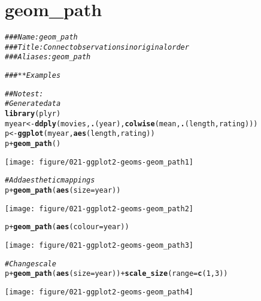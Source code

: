 \documentclass[a4paper,titlepage]{tufte-handout}\usepackage[]{graphicx}\usepackage[]{color}
\makeatletter
\def\maxwidth{ %
  \ifdim\Gin@nat@width>\linewidth
    \linewidth
  \else
    \Gin@nat@width
  \fi
}
\newcommand{\hlnum}[1]{\textcolor[rgb]{0.686,0.059,0.569}{#1}}%
\newcommand{\hlcom}[1]{\textcolor[rgb]{0.678,0.584,0.686}{\textit{#1}}}%
\newcommand{\hlopt}[1]{\textcolor[rgb]{0,0,0}{#1}}%
\newcommand{\hlstd}[1]{\textcolor[rgb]{0.345,0.345,0.345}{#1}}%
\newcommand{\hlkwb}[1]{\textcolor[rgb]{0.69,0.353,0.396}{#1}}%
\newcommand{\hlkwc}[1]{\textcolor[rgb]{0.333,0.667,0.333}{#1}}%
\newcommand{\hlkwd}[1]{\textcolor[rgb]{0.737,0.353,0.396}{\textbf{#1}}}%
\newenvironment{kframe}{%
 \def\at@end@of@kframe{}%
 \ifinner\ifhmode%
  \def\at@end@of@kframe{\end{minipage}}%
  \begin{minipage}{\columnwidth}%
 \fi\fi%
 \def\FrameCommand##1{\hskip\@totalleftmargin \hskip-\fboxsep
 \colorbox{shadecolor}{##1}\hskip-\fboxsep
     \hskip-\linewidth \hskip-\@totalleftmargin \hskip\columnwidth}%
 \MakeFramed {\advance\hsize-\width
   \@totalleftmargin\z@ \linewidth\hsize
   \@setminipage}}%
 {\par\unskip\endMakeFramed%
 \at@end@of@kframe}
\newenvironment{knitrout}{}{} %
\makeatother
\begin{document}
\section{geom\_path}

\begin{knitrout}
\color{fgcolor}\begin{kframe}
\begin{alltt}
\hlcom{### Name: geom_path}
\hlcom{### Title: Connect observations in original order}
\hlcom{### Aliases: geom_path}

\hlcom{### ** Examples}

\hlcom{## No test: }
\hlcom{# Generate data}
\hlkwd{library}\hlstd{(plyr)}
\hlstd{myear} \hlkwb{<-} \hlkwd{ddply}\hlstd{(movies,} \hlkwd{.}\hlstd{(year),} \hlkwd{colwise}\hlstd{(mean,} \hlkwd{.}\hlstd{(length, rating)))}
\hlstd{p} \hlkwb{<-} \hlkwd{ggplot}\hlstd{(myear,} \hlkwd{aes}\hlstd{(length, rating))}
\hlstd{p} \hlopt{+} \hlkwd{geom_path}\hlstd{()}
\end{alltt}
\end{kframe}
\texttt{[image: figure/021-ggplot2-geoms-geom\_path1]} 
\begin{kframe}\begin{alltt}
\hlcom{# Add aesthetic mappings}
\hlstd{p} \hlopt{+} \hlkwd{geom_path}\hlstd{(}\hlkwd{aes}\hlstd{(}\hlkwc{size} \hlstd{= year))}
\end{alltt}
\end{kframe}
\texttt{[image: figure/021-ggplot2-geoms-geom\_path2]} 
\begin{kframe}\begin{alltt}
\hlstd{p} \hlopt{+} \hlkwd{geom_path}\hlstd{(}\hlkwd{aes}\hlstd{(}\hlkwc{colour} \hlstd{= year))}
\end{alltt}
\end{kframe}
\texttt{[image: figure/021-ggplot2-geoms-geom\_path3]} 
\begin{kframe}\begin{alltt}
\hlcom{# Change scale}
\hlstd{p} \hlopt{+} \hlkwd{geom_path}\hlstd{(}\hlkwd{aes}\hlstd{(}\hlkwc{size} \hlstd{= year))} \hlopt{+} \hlkwd{scale_size}\hlstd{(}\hlkwc{range} \hlstd{=} \hlkwd{c}\hlstd{(}\hlnum{1}\hlstd{,} \hlnum{3}\hlstd{))}
\end{alltt}
\end{kframe}
\texttt{[image: figure/021-ggplot2-geoms-geom\_path4]} 
\begin{kframe}\begin{alltt}

\end{alltt}
\end{kframe}
\end{knitrout}
\end{document}
